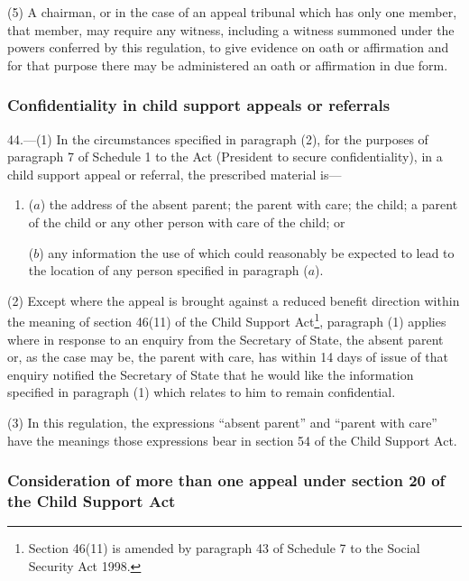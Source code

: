 \documentclass[12pt,a4paper]{article}
\begin{document}
(5) A chairman, or in the case of an appeal tribunal which has only one member, that member, may require any witness, including a witness summoned under the powers conferred by this regulation, to give evidence on oath or affirmation and for that purpose there may be administered an oath or affirmation in due form.

\subsubsection[44. Confidentiality in child support appeals or referrals]{Confidentiality in child support appeals or referrals}

44.—(1) In the circumstances specified in paragraph (2), for the purposes of paragraph 7 of Schedule 1 to the Act (President to secure confidentiality), in a child support appeal or referral, the prescribed material is—
\begin{enumerate}\item[]
($a$) the address of the absent parent; the parent with care; the child; a parent of the child or any other person with care of the child; or

($b$) any information the use of which could reasonably be expected to lead to the location of any person specified in paragraph ($a$).
\end{enumerate}

(2) Except where the appeal is brought against a reduced benefit direction within the meaning of section 46(11) of the Child Support Act\footnote{\frenchspacing Section 46(11) is amended by paragraph 43 of Schedule 7 to the Social Security Act 1998.}, paragraph (1) applies where in response to an enquiry from the Secretary of State, the absent parent or, as the case may be, the parent with care, has within 14 days of issue of that enquiry notified the Secretary of State that he would like the information specified in paragraph (1) which relates to him to remain confidential.

(3) In this regulation, the expressions “absent parent” and “parent with care” have the meanings those expressions bear in section 54 of the Child Support Act.

\subsubsection[45. Consideration of more than one appeal under section 20 of the Child Support Act]{Consideration of more than one appeal under section 20 of the Child Support Act}
\end{document}
